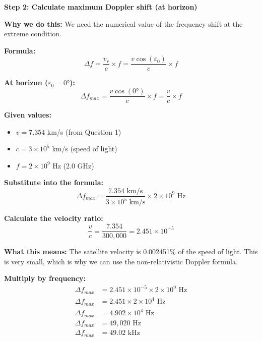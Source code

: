 \documentclass[11pt,letterpaper]{article}
\begin{document}
\vspace{0.3cm}

\textbf{Step 2: Calculate maximum Doppler shift (at horizon)}

\textbf{Why we do this:} We need the numerical value of the frequency shift at the extreme condition.

\textbf{Formula:}
\begin{equation}
\Delta f = \frac{v_r}{c} \times f = \frac{v \cos(\varepsilon_0)}{c} \times f
\end{equation}

\textbf{At horizon ($\varepsilon_0 = 0°$):}
\begin{equation}
\Delta f_{max} = \frac{v \cos(0°)}{c} \times f = \frac{v}{c} \times f
\end{equation}

\textbf{Given values:}
\begin{itemize}
    \item $v = 7.354$ km/s (from Question 1)
    \item $c = 3 \times 10^5$ km/s (speed of light)
    \item $f = 2 \times 10^9$ Hz (2.0 GHz)
\end{itemize}

\textbf{Substitute into the formula:}
\begin{equation}
\Delta f_{max} = \frac{7.354 \text{ km/s}}{3 \times 10^5 \text{ km/s}} \times 2 \times 10^9 \text{ Hz}
\end{equation}

\textbf{Calculate the velocity ratio:}
\begin{equation}
\frac{v}{c} = \frac{7.354}{300,000} = 2.451 \times 10^{-5}
\end{equation}

\textbf{What this means:} The satellite velocity is 0.002451\% of the speed of light. This is very small, which is why we can use the non-relativistic Doppler formula.

\textbf{Multiply by frequency:}
\begin{align}
\Delta f_{max} &= 2.451 \times 10^{-5} \times 2 \times 10^9 \text{ Hz} \\
\Delta f_{max} &= 2.451 \times 2 \times 10^{4} \text{ Hz} \\
\Delta f_{max} &= 4.902 \times 10^{4} \text{ Hz} \\
\Delta f_{max} &= 49,020 \text{ Hz} \\
\Delta f_{max} &= 49.02 \text{ kHz}
\end{align}
\end{document}
